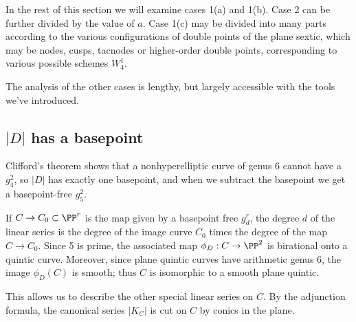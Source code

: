 In the rest of this section we will examine cases 1(a) and 1(b). Case 2 can
be further divided by the value of $a$.
Case 1(c) may be divided into many parts according to the various
configurations
of double points of the plane sextic, which may be nodes, cusps, tacnodes
or higher-order double points,  corresponding to various possible
schemes $W^{1}_{4}$.

The analysis of the other cases is lengthy, but largely accessible with
the tools we've introduced.


\subsection*{$|D|$ has a basepoint}

Clifford's theorem shows that a nonhyperelliptic curve of genus 6 cannot
have a $g^2_4$, so
$|D|$ has exactly one basepoint, and when we subtract the basepoint we
get a basepoint-free $g^2_5$.

If $C \to C_0 \subset \PP^r$ is the map given by a basepoint free $g^r_d$,
the degree $d$ of the linear series is the degree of the image curve $C_0$
times the degree of the map $C \to C_0$. Since 5 is prime, the associated
map $\phi_D : C \to \PP^2$ is birational onto a quintic curve. Moreover,
since
%
plane quintic
 curves have
arithmetic genus 6,
%
the image $\phi_D(C)$
is smooth; thus $C$ is isomorphic to a smooth plane quintic.

This allows us to describe the other special linear series on $C$. By
the adjunction formula, the canonical series $|K_C|$ is cut on $C$
by conics in the plane.

